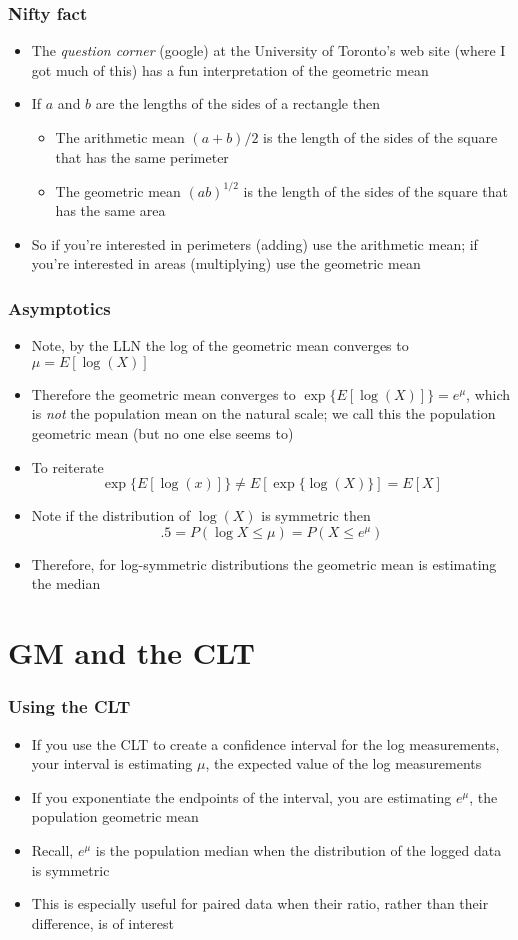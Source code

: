 \documentclass[aspectratio=169]{beamer}
\begin{document}
\begin{frame}\frametitle{Nifty fact}
\begin{itemize}
\item The {\em question corner} (google) at the University of 
  Toronto's web site (where I got much of this) has a fun interpretation
  of the geometric mean
\item If $a$ and $b$ are the lengths of the sides of a rectangle then
  \begin{itemize}
  \item The arithmetic mean $(a + b) / 2$ is the length of the sides of the square that
    has the same perimeter
  \item The geometric mean $(ab)^{1/2}$ is the length of the sides of
    the square that has the same area
  \end{itemize}
\item So if you're interested in perimeters (adding) use the
  arithmetic mean; if you're interested in areas (multiplying) use the
  geometric mean
\end{itemize}
\end{frame}

\begin{frame}\frametitle{Asymptotics}
\begin{itemize}
\item Note, by the LLN the log of the geometric mean converges to $\mu = E[\log(X)]$
\item Therefore the geometric mean converges to $\exp\{E[\log(X)]\} =
  e^\mu$, which is {\em not} the population mean on the natural scale;
  we call this the population geometric mean (but no one else seems
  to)
\item To reiterate
  $$
  \exp\{E[\log(x)]\} \neq E[\exp\{\log(X)\}] = E[X]
  $$
\item Note if the distribution of $\log(X)$ is symmetric
  then
  $$
  .5 = P(\log X \leq \mu) = P(X \leq e^\mu)
  $$
\item Therefore, for log-symmetric distributions the geometric mean is
  estimating the median
\end{itemize}
\end{frame}

\section{GM and the CLT}
\begin{frame}\frametitle{Using the CLT}
\begin{itemize}
\item If you use the CLT to create a confidence interval for the log
  measurements, your interval is estimating $\mu$, the expected
  value of the log measurements
\item If you exponentiate the endpoints of the interval, you are
  estimating $e^\mu$, the population geometric mean
\item Recall, $e^\mu$ is the population median when the distribution
  of the logged data is symmetric
\item This is especially useful for paired data when their ratio, rather than
  their difference, is of interest
\end{itemize}
\end{frame}
\end{document}
